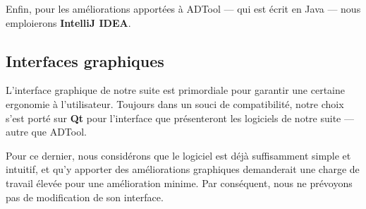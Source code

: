         Enfin, pour les améliorations apportées à ADTool --- qui est écrit en Java --- nous emploierons {\bf IntelliJ IDEA}.

    \subsection{Interfaces graphiques}
        L'interface graphique de notre suite est primordiale pour garantir une certaine ergonomie à l'utilisateur. Toujours dans un souci de compatibilité, notre choix s'est porté sur {\bf Qt} pour l'interface que présenteront les logiciels de notre suite --- autre que ADTool. 
        
        Pour ce dernier, nous considérons que le logiciel est déjà suffisamment simple et intuitif, et qu'y apporter des améliorations graphiques demanderait une charge de travail élevée pour une amélioration minime. Par conséquent, nous ne prévoyons pas de modification de son interface.

